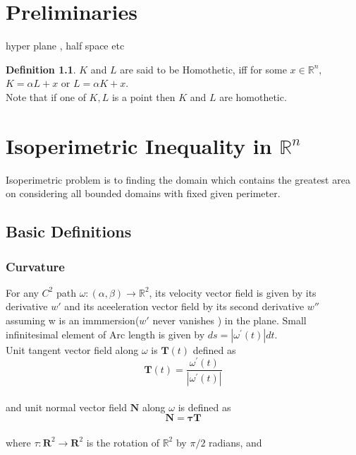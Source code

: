 \documentclass[oneside]{book}
\theoremstyle{definition}
\newtheorem{mydef}{Definition}[chapter]
\begin{document}
\chapter{Preliminaries }
\label{chap:c2}
hyper plane , half space etc 
\begin{mydef}
$K$ and $L$ are said to be Homothetic, iff for some $x  \in \mathbb{R}^n,$ $K = \alpha L + x$ or $L=\alpha K+x $.\\
Note that if one of $K,L $ is a point then $K $ and $L$ are homothetic.
\end{mydef}
\label{def:2.1}
 \chapter{Isoperimetric Inequality in $\mathbb{R}^{n}$} 
 \label{chap:c3}
 Isoperimetric problem is to finding the domain which contains the greatest area on considering  all bounded domains with fixed given perimeter.
 

\section{\textbf{Basic Definitions}}\label{s:2}
\subsection{Curvature}
\label{ss:1}
    
For any $C^{2}$ path $\omega:(\alpha, \beta) \rightarrow \mathbb{R}^{2}$, its velocity vector field is given by its derivative $w'$ and its aceeleration vector field by its second derivative $w''$ assuming w is an immmersion($w'$ never vanishes ) in the plane.  Small infinitesimal element of Arc length is given by  $d s=\left|\omega^{\prime}(t)\right| d t$.
\\Unit tangent vector field along $\omega$ is $\mathbf{T}(t)$ defined as \\

\begin{equation}
\label{eq1}  
\textbf{{T}}(t)=\frac{\omega^{\prime}(t)}{\left|\omega^{\prime}(t)\right|}
\end{equation}  \\
and unit normal vector field $\mathbf{N}$ along $\omega$ is defined as 
\begin{equation}
\label{eq2}  
     \mathbf{N}=\mathbf{\tau} \mathbf{T}
\end{equation} \\
   where $ \tau: \mathbf{R}^{2} \rightarrow \mathbf{R}^{2}$ is the rotation of $\mathbb{R}^{2}$ by $\pi / 2$ radians, and
\end{document}
